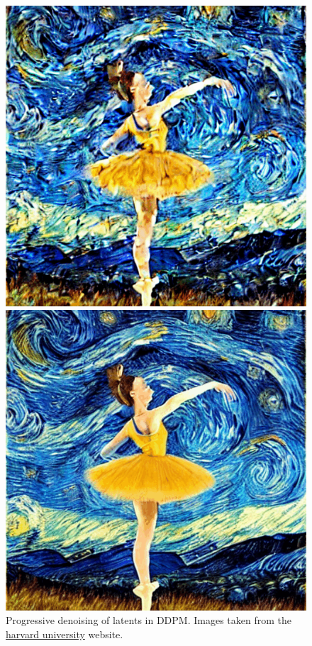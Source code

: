 \begin{figure}[h]
\begin{minipage}{0.10\textwidth}
    \end{minipage}
    \begin{minipage}{0.10\textwidth}
        \centering
        \includegraphics[width=\textwidth]{images/diffusion_models/noise_to_image_gif/6.png}
    \end{minipage}
    \begin{minipage}{0.10\textwidth}
        \centering
        \includegraphics[width=\textwidth]{images/diffusion_models/noise_to_image_gif/7.png}
    \end{minipage}
    \caption{Progressive denoising of latents in DDPM. Images taken from the \href{https://scholar.harvard.edu/binxuw/classes/machine-learning-scratch/materials/stable-diffusion-scratch}{harvard university} website.}
    \label{fig:ddpm_progressive_denoising}
\end{figure}


